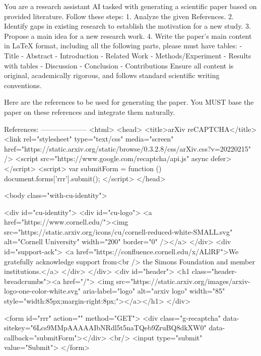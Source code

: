 
        You are a research assistant AI tasked with generating a scientific paper based on provided literature. Follow these steps:
    1. Analyze the given References.
    2. Identify gaps in existing research to establish the motivation for a new study.
    3. Propose a main idea for a new research work.
    4. Write the paper's main content in LaTeX format, including all the following parts, please must have tables:
    - Title
    - Abstract
    - Introduction
    - Related Work
    - Methods/Experiment
    - Results with tables
    - Discussion
    - Conclusion
    - Contributions
    Ensure all content is original, academically rigorous, and follows standard scientific writing conventions.

        Here are the references to be used for generating the paper.
        You MUST base the paper on these references and integrate them naturally.

        References:
        --------------------
        <html>
     <head>
       <title>arXiv reCAPTCHA</title>
       <link rel="stylesheet" type="text/css" media="screen" href="https://static.arxiv.org/static/browse/0.3.2.8/css/arXiv.css?v=20220215" />
       <script src="https://www.google.com/recaptcha/api.js" async defer></script>
       <script>
         var submitForm = function () {
             document.forms['rrr'].submit();
         }
       </script>
     </head>

     <body class="with-cu-identity">

       <div id="cu-identity">
         <div id="cu-logo">
           <a href="https://www.cornell.edu/"><img src="https://static.arxiv.org/icons/cu/cornell-reduced-white-SMALL.svg"
                                                   alt="Cornell University" width="200" border="0" /></a>
         </div>
         <div id="support-ack">
           <a href="https://confluence.cornell.edu/x/ALlRF">We gratefully acknowledge support from<br />
             the Simons Foundation and member institutions.</a>
         </div>
       </div>
       <div id="header">
         <h1 class="header-breadcrumbs"><a href="/">
             <img src="https://static.arxiv.org/images/arxiv-logo-one-color-white.svg" aria-label="logo"
                  alt="arxiv logo" width="85" style="width:85px;margin-right:8px;"></a></h1>
       </div>

       <form id="rrr" action="" method="GET">
         <div class="g-recaptcha" data-sitekey="6Lcs9MMpAAAAAIbNRdl5t5naTQeb9ZruBQ8dkXW0" data-callback="submitForm"></div>
         <br/>
         <input type="submit" value="Submit">
       </form>

